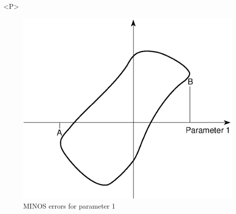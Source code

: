 \begin{htmlonly}
\begin{rawhtml}<P>\end{rawhtml}
\begin{figure}
\begin{makeimage}
\includegraphics[width=\linewidth]{minoserr.eps}
\end{makeimage}
\caption{MINOS errors for parameter 1}
\label{fig:MINoserror}
\end{figure}


\end{htmlonly}
